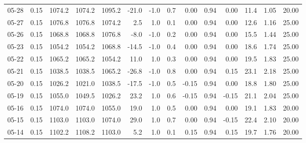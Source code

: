 \begin{threeparttable}
{\begin{tabular}{lrrrrrrrrrrrrr}
  05-28 &     0.15 & 1074.2 & 1074.2 & 1095.2 &      -21.0 &                     -1.0 &                 0.7 &       0.00 &      0.94 &           0.00 &             11.4 &            1.05 &                  20.00 \\
  05-27 &     0.15 & 1076.8 & 1076.8 & 1074.2 &        2.5 &                      1.0 &                 0.1 &       0.00 &      0.94 &           0.00 &             12.6 &            1.16 &                  25.00 \\
  05-26 &     0.15 & 1068.8 & 1068.8 & 1076.8 &       -8.0 &                     -1.0 &                 0.2 &       0.00 &      0.94 &           0.00 &             15.5 &            1.44 &                  25.00 \\
  05-23 &     0.15 & 1054.2 & 1054.2 & 1068.8 &      -14.5 &                     -1.0 &                 0.4 &       0.00 &      0.94 &           0.00 &             18.6 &            1.74 &                  25.00 \\
  05-22 &     0.15 & 1065.2 & 1065.2 & 1054.2 &       11.0 &                      1.0 &                 0.3 &       0.00 &      0.94 &           0.00 &             19.5 &            1.83 &                  25.00 \\
  05-21 &     0.15 & 1038.5 & 1038.5 & 1065.2 &      -26.8 &                     -1.0 &                 0.8 &       0.00 &      0.94 &           0.15 &             23.1 &            2.18 &                  25.00 \\
  05-20 &     0.15 & 1026.2 & 1021.0 & 1038.5 &      -17.5 &                     -1.0 &                 0.5 &      -0.15 &      0.94 &           0.00 &             18.8 &            1.80 &                  25.00 \\
  05-19 &     0.15 & 1055.0 & 1049.5 & 1026.2 &       23.2 &                      1.0 &                 0.6 &      -0.15 &      0.94 &          -0.15 &             21.1 &            2.04 &                  25.00 \\
  05-16 &     0.15 & 1074.0 & 1074.0 & 1055.0 &       19.0 &                      1.0 &                 0.5 &       0.00 &      0.94 &           0.00 &             19.1 &            1.83 &                  20.00 \\
  05-15 &     0.15 & 1103.0 & 1103.0 & 1074.0 &       29.0 &                      1.0 &                 0.7 &       0.00 &      0.94 &          -0.15 &             22.4 &            2.10 &                  20.00 \\
  05-14 &     0.15 & 1102.2 & 1108.2 & 1103.0 &        5.2 &                      1.0 &                 0.1 &       0.15 &      0.94 &           0.15 &             19.7 &            1.76 &                  20.00 \\

\end{tabular}}
\end{threeparttable}
